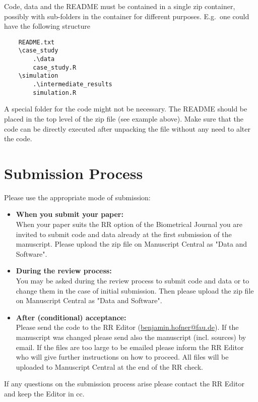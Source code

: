 \documentclass[12pt,a4paper]{article}
\begin{document}
Code, data and the README {must} be contained in a single zip container,
possibly with sub-folders in the container for different purposes. E.g.\ one
could have the following structure

\begin{verbatim}
    README.txt
    \case_study
        .\data
        case_study.R
    \simulation
        .\intermediate_results
        simulation.R
\end{verbatim}

A special folder for the code might not be necessary. The README should be
placed in the top level of the zip file (see example above). Make sure that the
code can be directly executed after unpacking the file without any need to alter
the code.

\newpage

\section{Submission Process}

Please use the appropriate mode of submission:

\begin{itemize}
\item \textbf{When you submit your paper:}\\[0.5em]
  When your paper suits the RR option of the Biometrical Journal you are
  invited to submit code and data already at the first submission of the
  manuscript. Please upload the zip file on Manuscript Central as "Data and
  Software".
\item \textbf{During the review process:}\\[0.5em]
  You may be asked during the review process to submit code and data or to
  change them in the case of initial submission. Then please upload the zip file
  on Manuscript Central as "Data and Software".
\item \textbf{After (conditional) acceptance:}\\[0.5em]
  Please send the code to the RR Editor
  (\href{mailto:benjamin.hofner@fau.de}{benjamin.hofner@fau.de}). If the
  manuscript was changed please send also the manuscript (incl. sources) by
  email. If the files are too large to be emailed please inform the RR Editor
  who will give further instructions on how to proceed. All files will be
  uploaded to Manuscript Central at the end of the RR check.
\end{itemize}

If any questions on the submission process arise please contact the RR Editor
and keep the Editor in cc.
\end{document}
